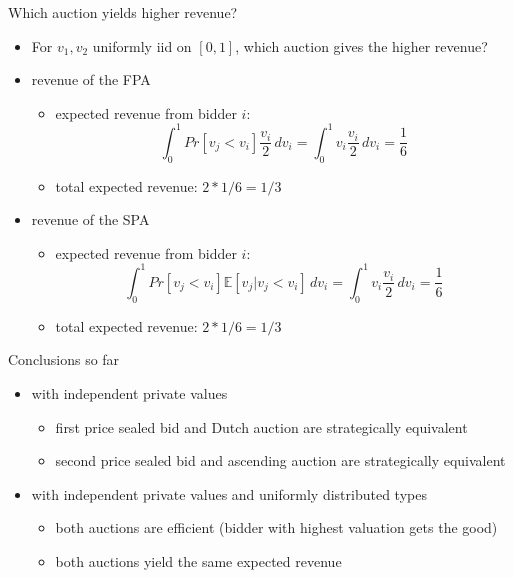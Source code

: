 \documentclass[bigger]{beamer}
\begin{document}
\begin{frame}[label={sec:orgf552767}]{Which auction yields higher revenue?}
\begin{itemize}
\item For \(v_1 , v_2\) uniformly iid on \([0,1]\), which auction gives the higher revenue?
\item revenue of the FPA
\begin{itemize}
\item expected revenue from bidder \(i\):
$$\int_0^1 Pr[v_j<v_i]\frac{v_i}{2}\,dv_i=\int_0^1 v_i\frac{v_i}{2}\,dv_i=\frac{1}{6} $$
\item total expected revenue: \(2*1/6=1/3\)
\end{itemize}
\item revenue of the SPA
\begin{itemize}
\item expected revenue from bidder \(i\):
$$\int_0^1 Pr[v_j<v_i]\mathbb{E}[v_j|v_j<v_i]\,dv_i=\int_0^1 v_i \frac{v_i}{2}\,dv_i=\frac{1}{6} $$
\item total expected revenue: \(2*1/6=1/3\)
\end{itemize}
\end{itemize}
\end{frame}

\begin{frame}[label={sec:org2cfed01}]{Conclusions so far}
\begin{itemize}
\item with independent private values
\begin{itemize}
\item first price sealed bid and Dutch auction are strategically equivalent
\item second price sealed bid and ascending auction are strategically equivalent
\end{itemize}
\item with independent private values and uniformly distributed types
\begin{itemize}
\item both auctions are efficient (bidder with highest valuation gets the good)
\item both auctions yield the same expected revenue
\end{itemize}
\end{itemize}
\end{frame}
\end{document}
